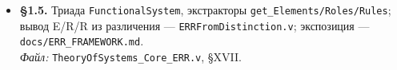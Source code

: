 \documentclass[12pt,a4paper]{article}
\begin{document}
\begin{itemize}
\item \textbf{§1.5.} Триада \texttt{FunctionalSystem}, экстракторы
\texttt{get\_Elements/Roles/Rules}; вывод E/R/R из различения ---
\texttt{ERRFromDistinction.v}; экспозиция --- \texttt{docs/ERR\_FRAMEWORK.md}.\\
\emph{Файл:} \texttt{TheoryOfSystems\_Core\_ERR.v}, §XVII.
\end{itemize}
\normalsize

\end{document}
